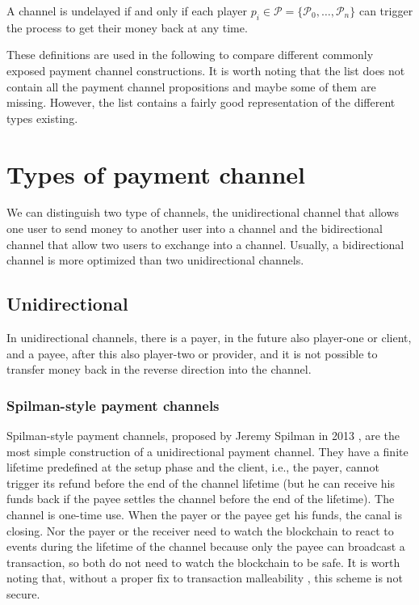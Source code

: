 \begin{definition}[Undelayed]
  A channel is undelayed if and only if each player $p_i \in \mathcal{P} = \{\mathcal{P}_0,
  \dots, \mathcal{P}_n\}$ can trigger the process to get their money back at any time.
\end{definition}

These definitions are used in the following to compare different commonly
exposed payment channel constructions. It is worth noting that the list does not
contain all the payment channel propositions and maybe some of them are missing.
However, the list contains a fairly good representation of the different types
existing.

\minitoc

\newpage

\section{Types of payment channel}

We can distinguish two type of channels, the unidirectional channel that allows
one user to send money to another user into a channel and the bidirectional
channel that allow two users to exchange into a channel. Usually, a
bidirectional channel is more optimized than two unidirectional channels.

\subsection{Unidirectional}

In unidirectional channels, there is a payer, in the future also player-one or
client, and a payee, after this also player-two or provider, and it is not
possible to transfer money back in the reverse direction into the channel.

\subsubsection{Spilman-style payment channels}

Spilman-style payment channels, proposed by Jeremy Spilman in 2013
\cite{SpilmanStyle}, are the most simple construction of a unidirectional
payment channel. They have a finite lifetime predefined at the setup phase and
the client, i.e., the payer, cannot trigger its refund before the end of the
channel lifetime (but he can receive his funds back if the payee settles the
channel before the end of the lifetime). The channel is one-time use. When the
payer or the payee get his funds, the canal is closing. Nor the payer or the
receiver need to watch the blockchain to react to events during the lifetime of
the channel because only the payee can broadcast a transaction, so both do not
need to watch the blockchain to be safe. It is worth noting that, without a
proper fix to transaction malleability \cite{SegWitBIP, BIP62,
DBLP:journals/corr/AndrychowiczDMM13, DBLP:journals/corr/DeckerW14}, this scheme
is not secure.

